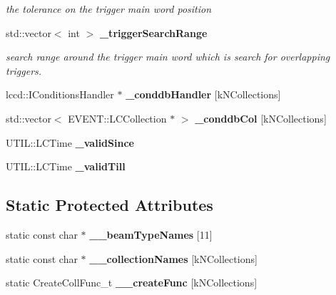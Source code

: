 \begin{DoxyCompactItemize}
\begin{DoxyCompactList}\small\item\em the tolerance on the trigger main word position \item\end{DoxyCompactList}\item 
std::vector$<$ int $>$ {\bf \_\-triggerSearchRange}
\begin{DoxyCompactList}\small\item\em search range around the trigger main word which is search for overlapping triggers. \item\end{DoxyCompactList}\item 
lccd::IConditionsHandler $\ast$ {\bfseries \_\-conddbHandler} [kNCollections]\label{classmarlin_1_1CaliceConditionsDataCreator_ac99c9b4383bf7e786b763f5789147b1c}

\item 
std::vector$<$ EVENT::LCCollection $\ast$ $>$ {\bfseries \_\-conddbCol} [kNCollections]\label{classmarlin_1_1CaliceConditionsDataCreator_a115c3f1d7deec6ab19666acff4be962e}

\item 
UTIL::LCTime {\bfseries \_\-validSince}\label{classmarlin_1_1CaliceConditionsDataCreator_aa0271519445413603682631355db7a63}

\item 
UTIL::LCTime {\bfseries \_\-validTill}\label{classmarlin_1_1CaliceConditionsDataCreator_a39ed98e58fe973f45aedbbf64a3aef2e}

\end{DoxyCompactItemize}
\subsection*{Static Protected Attributes}
\begin{DoxyCompactItemize}
\item 
static const char $\ast$ {\bfseries \_\-\_\-beamTypeNames} [11]\label{classmarlin_1_1CaliceConditionsDataCreator_a86e1060f18685fd8e77e84a396b9004f}

\item 
static const char $\ast$ {\bfseries \_\-\_\-collectionNames} [kNCollections]\label{classmarlin_1_1CaliceConditionsDataCreator_a828d149c7eaaa7c07aa28ccd2bcffd69}

\item 
static CreateCollFunc\_\-t {\bfseries \_\-\_\-createFunc} [kNCollections]\label{classmarlin_1_1CaliceConditionsDataCreator_a50bb1fc9365a24fde378c286a30cd47b}

\end{DoxyCompactItemize}
